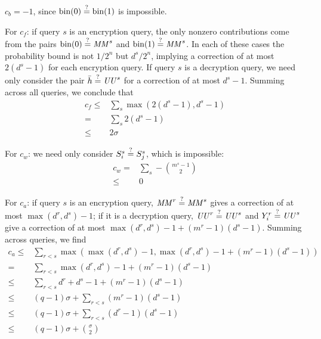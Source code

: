 \documentclass[hctr2.tex]{subfiles}
\begin{document}
\(c_b = -1\), since 
\(\operatorname{bin}(0) \stackrel{\text{?}}{=} \operatorname{bin}(1)\) is impossible.

For \(c_f\): if query \(s\) is an encryption query,
the only nonzero contributions come from the pairs
\(\operatorname{bin}(0) \stackrel{\text{?}}{=} \mathit{MM}^s\) and
\(\operatorname{bin}(1) \stackrel{\text{?}}{=} \mathit{MM}^s\). In each of these
cases the probability bound is not \(1/2^n\) but
\(d^s/2^n\), implying a correction of at most
\(2(d^s - 1)\) for each encryption query.
If query \(s\) is a decryption query,
we need only consider the pair \(\bar{h} \stackrel{\text{?}}{=} \mathit{UU}^s\)
for a correction of at most \(d^s - 1\). 
Summing across all queries, we conclude that
\begin{align*}
    c_f \leq &\sum_s \max(2(d^s - 1), d^s - 1) \\
        = &\sum_s 2(d^s - 1) \\
        \leq & 2\sigma
\end{align*}

For \(c_w\): we need only consider \(S_i^s \stackrel{\text{?}}{=} S_j^s\),
which is impossible:
\begin{align*}
    c_w = &\sum_s -\binom{m^s -1}{2} \\
        \leq &0
\end{align*}

For \(c_a\): if query \(s\) is an encryption query,
\(\mathit{MM}^r \stackrel{\text{?}}{=} \mathit{MM}^s\) gives a correction of
at most \(\max(d^r, d^s) -1\);
if it is a decryption query,
\(\mathit{UU}^r \stackrel{\text{?}}{=} \mathit{UU}^s\) and \(Y_i^r \stackrel{\text{?}}{=} \mathit{UU}^s\)
give a correction of at most
\(\max(d^r, d^s) -1 + (m^r -1 )(d^s -1)\).
Summing across queries, we find
\begin{align*}
    c_a \leq &\sum_{r<s} \max(\max(d^r, d^s) -1, \max(d^r, d^s) -1 + (m^r -1 )(d^s -1)) \\
           = &\sum_{r<s} \max(d^r, d^s) -1 + (m^r -1 )(d^s -1) \\
        \leq & \sum_{r < s} d^r + d^s -1 + (m^r -1 )(d^s -1)\\
        \leq & (q-1)\sigma + \sum_{r < s} (m^r -1 )(d^s -1) \\
        \leq & (q-1)\sigma + \sum_{r < s} (d^r -1)(d^s -1) \\
        \leq & (q-1)\sigma + \binom{\sigma}{2}
\end{align*}
\end{document}
